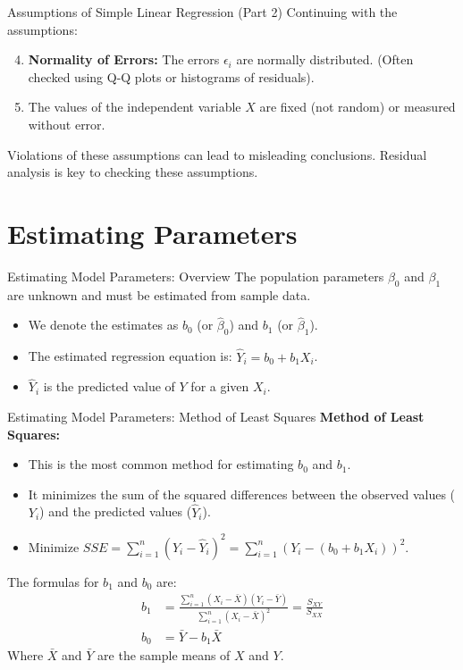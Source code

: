 \documentclass[aspectratio=169]{beamer}
\begin{document}
\begin{frame}{Assumptions of Simple Linear Regression (Part 2)}
  Continuing with the assumptions:
  \begin{enumerate}
    \setcounter{enumi}{3} %
    \item \textbf{Normality of Errors:} The errors $\epsilon_i$ are normally distributed. (Often checked using Q-Q plots or histograms of residuals).
    \item The values of the independent variable $X$ are fixed (not random) or measured without error.
  \end{enumerate}
  \vspace{1em}
  Violations of these assumptions can lead to misleading conclusions. Residual analysis is key to checking these assumptions.
\end{frame}

\section{Estimating Parameters}
\begin{frame}{Estimating Model Parameters: Overview}
  The population parameters $\beta_0$ and $\beta_1$ are unknown and must be estimated from sample data.
  \begin{itemize}
    \item We denote the estimates as $b_0$ (or $\hat{\beta}_0$) and $b_1$ (or $\hat{\beta}_1$).
    \item The estimated regression equation is: $\hat{Y}_i = b_0 + b_1 X_i$.
    \item $\hat{Y}_i$ is the predicted value of $Y$ for a given $X_i$.
  \end{itemize}
\end{frame}

\begin{frame}{Estimating Model Parameters: Method of Least Squares}
  \textbf{Method of Least Squares:}
  \begin{itemize}
    \item This is the most common method for estimating $b_0$ and $b_1$.
    \item It minimizes the sum of the squared differences between the observed values ($Y_i$) and the predicted values ($\hat{Y}_i$).
    \item Minimize $SSE = \sum_{i=1}^{n} (Y_i - \hat{Y}_i)^2 = \sum_{i=1}^{n} (Y_i - (b_0 + b_1 X_i))^2$.
  \end{itemize}
  The formulas for $b_1$ and $b_0$ are:
  \begin{align*}
    b_1 &= \frac{\sum_{i=1}^{n} (X_i - \bar{X})(Y_i - \bar{Y})}{\sum_{i=1}^{n} (X_i - \bar{X})^2} = \frac{S_{XY}}{S_{XX}} \\
    b_0 &= \bar{Y} - b_1 \bar{X}
  \end{align*}
  Where $\bar{X}$ and $\bar{Y}$ are the sample means of $X$ and $Y$.
\end{frame}
\end{document}
